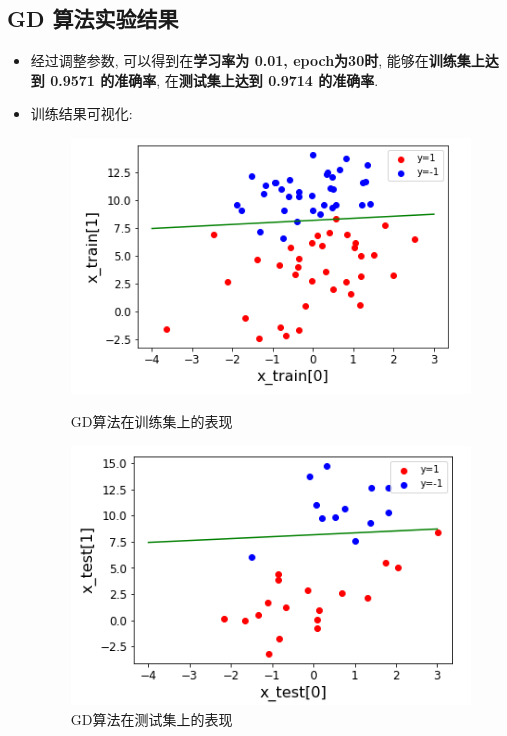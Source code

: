 \documentclass[UTF8]{article}
\begin{document}
\subsection{GD 算法实验结果}
\begin{itemize}
	\item 经过调整参数, 可以得到在\textbf{学习率为 0.01, epoch为30时}, 能够在\textbf{训练集上达到 0.9571 的准确率}, 在\textbf{测试集上达到 0.9714 的准确率}.
	\item 训练结果可视化:
	\begin{figure}[H]
		\begin{minipage}[H]{0.5\linewidth}
			\centering
			\includegraphics[width=\linewidth]{gd_train.png}
			\caption{GD算法在训练集上的表现}
		\end{minipage}
		\begin{minipage}[H]{0.5\linewidth}
			\centering
			\includegraphics[width=\linewidth]{gd_test.png}
			\caption{GD算法在测试集上的表现}
		\end{minipage}
	\end{figure}
\end{itemize}
\end{document}

